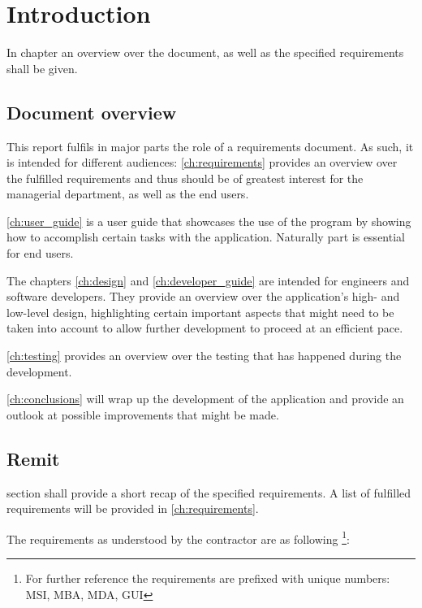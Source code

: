 \chapter{Introduction}\label{ch:introduction}

In  chapter an overview over the document, as well as the specified requirements shall be given.

\section{Document overview}
\label{sec:document_overview}

This report fulfils in major parts the role of a requirements document. As such, it is intended for different audiences:
\autoref{ch:requirements} provides an overview over the fulfilled requirements and thus should be of greatest interest for the managerial department, as well as the end users.

\autoref{ch:user_guide} is a user guide that showcases the use of the program by showing how to accomplish certain tasks with the application. Naturally  part is essential for end users.

The chapters \autoref{ch:design} and \autoref{ch:developer_guide} are intended for engineers and software developers. They provide an overview over the application's high- and low-level design, highlighting certain important aspects that might need to be taken into account to allow further development to proceed at an efficient pace.

\autoref{ch:testing} provides an overview over the testing that has happened during the development.

\autoref{ch:conclusions} will wrap up the development of the application and provide an outlook at possible improvements that might be made.

\section{Remit}
\label{sec:remit}

 section shall provide a short recap of the specified requirements. A list of fulfilled requirements will be provided in \autoref{ch:requirements}.

The requirements as understood by the contractor are as following \footnote{For further reference the requirements are prefixed with unique numbers: \ac{MSI}, \ac{MBA}, \ac{MDA}, \ac{GUI}}:

